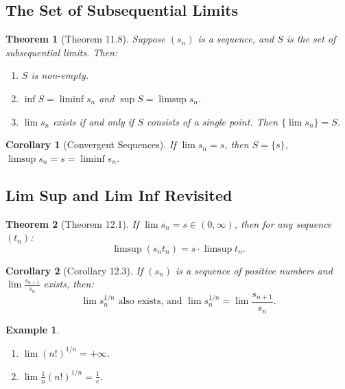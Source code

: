 \documentclass[9pt]{article}
\theoremstyle{definition}
\theoremstyle{plain}
\newtheorem{theorem}{Theorem}
\newtheorem{example}{Example}
\newtheorem{corollary}{Corollary}
\begin{document}
\subsection*{The Set of Subsequential Limits}
\begin{theorem}[Theorem 11.8]
Suppose \( (s_n) \) is a sequence, and \( S \) is the set of subsequential limits. Then:
\begin{enumerate}
    \item \( S \) is non-empty.
    \item \( \inf S = \liminf s_n \) and \( \sup S = \limsup s_n \).
    \item \( \lim s_n \) exists if and only if \( S \) consists of a single point. Then \( \{\lim s_n\} = S \).
\end{enumerate}
\end{theorem}

\begin{corollary}[Convergent Sequences]
If \( \lim s_n = s \), then \( S = \{s\} \), \( \limsup s_n = s = \liminf s_n \).
\end{corollary}

\subsection*{Lim Sup and Lim Inf Revisited}
\begin{theorem}[Theorem 12.1]
If \( \lim s_n = s \in (0, \infty) \), then for any sequence \( (t_n) \):
\[
\limsup (s_n t_n) = s \cdot \limsup t_n.
\]
\end{theorem}

\begin{corollary}[Corollary 12.3]
If \( (s_n) \) is a sequence of positive numbers and \( \lim \frac{s_{n+1}}{s_n} \) exists, then:
\[
\lim s_n^{1/n} \text{ also exists, and } \lim s_n^{1/n} = \lim \frac{s_{n+1}}{s_n}.
\]
\end{corollary}

\begin{example}
\leavevmode
\begin{enumerate}
    \item \( \lim (n!)^{1/n} = +\infty \).
    \item \( \lim \frac{1}{n} (n!)^{1/n} = \frac{1}{e} \).
\end{enumerate}
\end{example}
\end{document}
